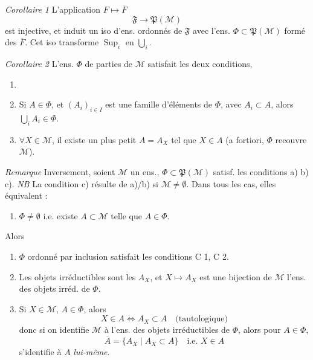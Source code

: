 \documentclass[11pt,a4paper]{article}
\begin{document}
\emph{Corollaire 1} \quad L'application $F \mapsto \overline{F}$
\[
  \mathfrak{F} \to \mathfrak{P}(\mathcal{M})
\]
est injective, et induit un iso \ill{} d'ens. ordonnés de $\mathfrak{F}$ avec l'ens. $\Phi \subset \mathfrak{P}(\mathcal{M})$ formé des $\overline{F}$. Cet iso transforme $\operatorname{Sup}_i$ en $\bigcup_i$.

\emph{Corollaire 2} \quad L'ens. $\Phi$ de parties de $\mathcal{M}$ satisfait les deux conditions,
\begin{enumerate}
  \item[\struck{a)}] \struck{$\Phi \neq \emptyset$}
  \item[a)] Si $A \in \Phi$, et $(A_i)_{i \in I}$ est une famille d'éléments de $\Phi$, avec $A_i \subset A$, alors $\bigcup_i A_i \in \Phi$.
  \item[b)] $\forall X \in \mathcal{M}$, il existe un plus petit $A = A_X$ tel que $X \in A$ (a fortiori, $\Phi$ recouvre $\mathcal{M}$).
\end{enumerate}


\emph{Remarque} \quad Inversement, soient $\mathcal{M}$ un ens., $\Phi \subset \mathfrak{P}(\mathcal{M})$ satisf.  les conditions a) b) c). \emph{NB} La condition c) résulte de a)/b) si $\mathcal{M} \neq \emptyset$. Dans tous les cas, elles équivalent :
\begin{enumerate}
  \item[c')] $\Phi \neq \emptyset$ \quad i.e. existe $A \subset \mathcal{M}$ telle que $A \in \Phi$.
\end{enumerate}

Alors
\begin{enumerate}
  \item[1°)] $\Phi$ ordonné par inclusion satisfait les conditions C 1, C 2. 
  \item[2°)] Les objets irréductibles sont les $A_X$, et $X \mapsto A_X$ est une bijection de $\mathcal{M}$  l'ens. des objets irréd. de $\Phi$.
  \item[3°)] Si $X \in \mathcal{M}$, $A \in \Phi$, alors
  \[
    X \in A \Longleftrightarrow A_X \subset A \quad \text{(tautologique)}
  \]
  donc \struck{\ill{}} si on identifie  $\mathcal{M}$ à l'ens. des objets irréductibles de $\Phi$, alors pour $A \in \Phi$,
  \[
    \overline{A} = \lbrace A_X \mid A_X \subset A \rbrace \quad \text{i.e. } X \in A
  \]
  s'identifie à $A$ \emph{lui-même}.
\end{enumerate}
\end{document}
